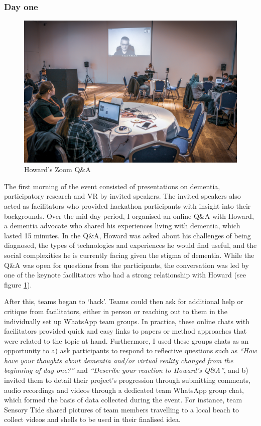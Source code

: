 \subsubsection{Day one}
\label{DayOne}

\begin{figure}[htp]
\centering
\includegraphics[width=.4\linewidth]{Images/DemVR/Howard.jpg}
\caption{Howard's Zoom Q\&A}
\label{fig:Howard}
\end{figure}
The first morning of the event consisted of presentations on dementia, participatory research and VR by invited speakers. The invited speakers also acted as facilitators who provided hackathon participants with insight into their backgrounds. Over the mid-day period, I organised an online Q\&A with Howard, a dementia advocate who shared his experiences living with dementia, which lasted 15 minutes. In the Q\&A, Howard was asked about his challenges of being diagnosed, the types of technologies and experiences he would find useful, and the social complexities he is currently facing given the stigma of dementia. While the Q\&A was open for questions from the participants, the conversation was led by one of the keynote facilitators who had a strong relationship with Howard (see figure \ref{fig:Howard}).

After this, teams began to `hack'. Teams could then ask for additional help or critique from facilitators, either in person or reaching out to them in the individually set up WhatsApp team groups. In practice, these online chats with facilitators provided quick and easy links to papers or method approaches that were related to the topic at hand. Furthermore, I used these groups chats as an opportunity to a) ask participants to respond to reflective questions such as \textit{``How have your thoughts about dementia and/or virtual reality changed from the beginning of day one?''} and \textit{``Describe your reaction to Howard’s Q\&A''}, and b) invited them to detail their project’s progression through submitting comments, audio recordings and videos through a dedicated team WhatsApp group chat, which formed the basis of data collected during the event. For instance, team Sensory Tide shared pictures of team members travelling to a local beach to collect videos and shells to be used in their finalised idea.

